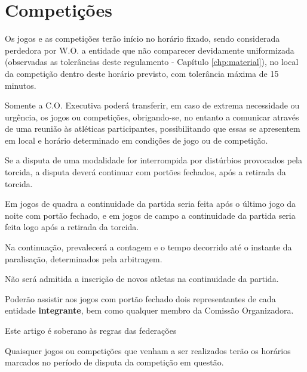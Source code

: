 {\let\clearpage\relax \chapter{Competições}}

\begin{article}
	Os jogos e as competições terão início no horário fixado, sendo considerada perdedora por W.O. a entidade que não comparecer devidamente uniformizada (observadas as tolerâncias deste regulamento - Capítulo \ref{chp:material}), no local da competição dentro deste horário previsto, com tolerância máxima de 15 minutos.
\end{article}

\begin{article}
	Somente a C.O. Executiva poderá transferir, em caso de extrema necessidade ou urgência, os jogos ou competições, obrigando-se, no entanto a comunicar através de uma reunião às atléticas participantes, possibilitando que essas se apresentem em local e horário determinado em condições de jogo ou de competição.
\end{article}

\begin{article}
	Se a disputa de uma modalidade for interrompida por distúrbios provocados pela torcida, a disputa deverá continuar com portões fechados, após a retirada da torcida.

	\begin{xparagraph}
		Em jogos de quadra a continuidade da partida seria feita após o último jogo da noite com portão fechado, e em jogos de campo a continuidade da partida seria feita logo após a retirada da torcida.
	\end{xparagraph}

	\begin{xparagraph}
		Na continuação, prevalecerá a contagem e o tempo decorrido até o instante da paralisação, determinados pela arbitragem.
	\end{xparagraph}

	\begin{xparagraph}
		Não será admitida a inscrição de novos atletas na continuidade da partida.
	\end{xparagraph}

	\begin{xparagraph}
		Poderão assistir aos jogos com portão fechado dois representantes de cada entidade \textbf{integrante}, bem como qualquer membro da Comissão Organizadora.
	\end{xparagraph}

	\begin{xparagraph}
		Este artigo é soberano às regras das federações
	\end{xparagraph}
\end{article}

\begin{article}
	\label{art:jogos.horario}
	Quaisquer jogos ou competições que venham a ser realizados terão os horários marcados no período de disputa da competição em questão.
\end{article}
